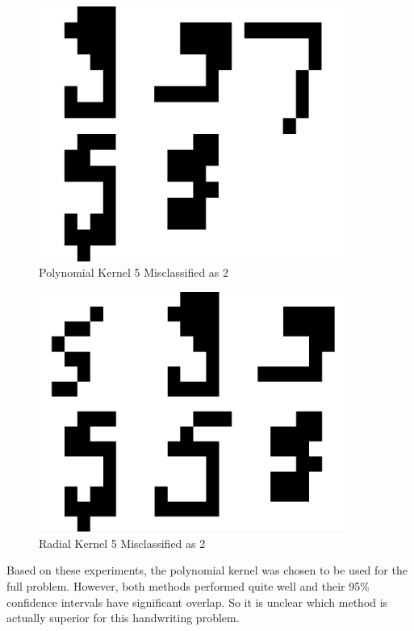 \documentclass{article}
\begin{document}
\begin{figure}
\centering
\includegraphics[width=0.9\textwidth]{images/test2_5_correct5_class2_a0156.png}
\caption{Polynomial Kernel 5 Misclassified as 2}
\label{poly5errortest}
\end{figure}

\begin{figure}
\centering
\includegraphics[width=0.9\textwidth]{images/test2_5_correct5_class2_radial.png}
\caption{Radial Kernel 5 Misclassified as 2}
\label{radial5errortest}
\end{figure}

Based on these experiments, the polynomial kernel was chosen to be used for the full problem. However, both methods performed quite well and their 95\% confidence intervals have significant overlap. So it is unclear which method is actually superior for this handwriting problem.
\end{document}
